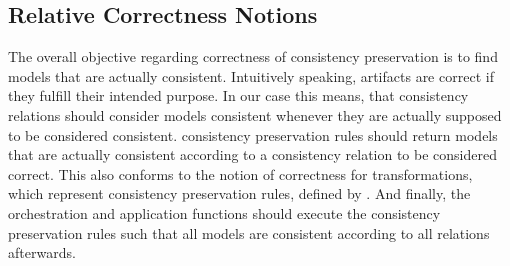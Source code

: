 

\subsection{Relative Correctness Notions}

The overall objective regarding correctness of consistency preservation is to find models that are actually consistent.
Intuitively speaking, artifacts are correct if they fulfill their intended purpose. 
In our case this means, that consistency relations should consider models consistent whenever they are actually supposed to be considered consistent. 
\Glspl{consistency preservation rule} should return models that are actually consistent according to a \gls{consistency relation} to be considered correct.
This also conforms to the notion of correctness for transformations, which represent \glspl{consistency preservation rule}, defined by \textcite{stevens2010sosym}.
And finally, the orchestration and application functions should execute the \glspl{consistency preservation rule} such that all models are consistent according to all relations afterwards.


